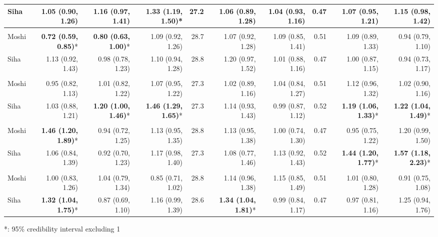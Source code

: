 \begin{table}[t]
\begin{tabular*}{\linewidth}{@{\extracolsep{\fill}}l|rrrrrrrrr}
Siha & 1.05 (0.90, 1.26) & 1.16 (0.97, 1.41) & \textbf{1.33 (1.19, 1.50)}* & 27.2 & 1.06 (0.89, 1.28) & 1.04 (0.93, 1.16) & 0.47 & 1.07 (0.95, 1.21) & 1.15 (0.98, 1.42) \\ 
\midrule\addlinespace[2.5pt]
\multicolumn{10}{l}{Diarrhea} \\[2.5pt] 
\midrule\addlinespace[2.5pt]
Moshi & \textbf{0.72 (0.59, 0.85)}* & \textbf{0.80 (0.63, 1.00)}* & 1.09 (0.92, 1.26) & 28.7 & 1.07 (0.92, 1.28) & 1.09 (0.85, 1.41) & 0.51 & 1.09 (0.89, 1.33) & 0.94 (0.79, 1.10) \\ 
Siha & 1.13 (0.92, 1.43) & 0.98 (0.78, 1.23) & 1.10 (0.94, 1.28) & 28.8 & 1.20 (0.97, 1.52) & 1.01 (0.88, 1.16) & 0.47 & 1.00 (0.87, 1.15) & 0.94 (0.73, 1.17) \\ 
\midrule\addlinespace[2.5pt]
\multicolumn{10}{l}{Urinary Tract Infections} \\[2.5pt] 
\midrule\addlinespace[2.5pt]
Moshi & 0.95 (0.82, 1.13) & 1.01 (0.82, 1.22) & 1.07 (0.95, 1.22) & 27.3 & 1.02 (0.89, 1.16) & 1.04 (0.84, 1.27) & 0.51 & 1.12 (0.96, 1.32) & 1.02 (0.90, 1.16) \\ 
Siha & 1.03 (0.88, 1.21) & \textbf{1.20 (1.00, 1.46)}* & \textbf{1.46 (1.29, 1.65)}* & 27.3 & 1.14 (0.93, 1.43) & 0.99 (0.87, 1.12) & 0.52 & \textbf{1.19 (1.06, 1.33)}* & \textbf{1.22 (1.04, 1.49)}* \\ 
\midrule\addlinespace[2.5pt]
\multicolumn{10}{l}{Malaria} \\[2.5pt] 
\midrule\addlinespace[2.5pt]
Moshi & \textbf{1.46 (1.20, 1.89)}* & 0.94 (0.72, 1.25) & 1.13 (0.95, 1.35) & 28.8 & 1.13 (0.95, 1.38) & 1.00 (0.74, 1.30) & 0.47 & 0.95 (0.75, 1.22) & 1.20 (0.99, 1.50) \\ 
Siha & 1.06 (0.84, 1.39) & 0.92 (0.70, 1.23) & 1.17 (0.98, 1.40) & 27.3 & 1.08 (0.77, 1.46) & 1.13 (0.92, 1.43) & 0.52 & \textbf{1.44 (1.20, 1.77)}* & \textbf{1.57 (1.18, 2.23)}* \\ 
\midrule\addlinespace[2.5pt]
\multicolumn{10}{l}{Infectious Eye Disease} \\[2.5pt] 
\midrule\addlinespace[2.5pt]
Moshi & 1.00 (0.83, 1.26) & 1.04 (0.79, 1.34) & 0.85 (0.71, 1.02) & 28.8 & 1.14 (0.96, 1.38) & 1.15 (0.85, 1.49) & 0.51 & 1.01 (0.80, 1.28) & 0.91 (0.75, 1.08) \\ 
Siha & \textbf{1.32 (1.04, 1.75)}* & 0.87 (0.69, 1.10) & 1.16 (0.99, 1.39) & 28.6 & \textbf{1.34 (1.04, 1.81)}* & 0.99 (0.84, 1.17) & 0.47 & 0.97 (0.81, 1.16) & 1.25 (0.94, 1.76) \\ 
\bottomrule
\end{tabular*}
\begin{minipage}{\linewidth}
*: 95\% credibility interval excluding 1\\
\end{minipage}
\end{table}

